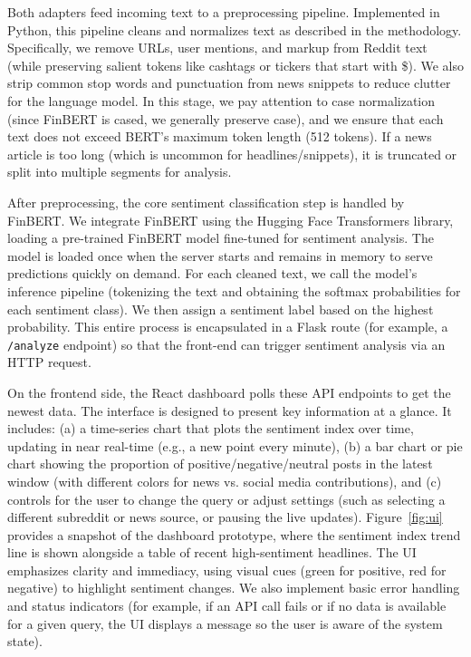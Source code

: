 \documentclass[12pt]{article}
\begin{document}
Both adapters feed incoming text to a preprocessing pipeline. Implemented in Python, this pipeline cleans and
normalizes text as described in the methodology. Specifically, we remove URLs, user mentions, and markup from
Reddit text (while preserving salient tokens like cashtags or tickers that start with \$). We also strip
common stop words and punctuation from news snippets to reduce clutter for the language model. In this stage,
we pay attention to case normalization (since FinBERT is cased, we generally preserve case), and we ensure
that each text does not exceed BERT's maximum token length (512 tokens). If a news article is too long (which
is uncommon for headlines/snippets), it is truncated or split into multiple segments for analysis.

After preprocessing, the core sentiment classification step is handled by FinBERT. We integrate FinBERT using
the Hugging Face Transformers library, loading a pre-trained FinBERT model fine-tuned for sentiment analysis.
The model is loaded once when the server starts and remains in memory to serve predictions quickly on demand.
For each cleaned text, we call the model's inference pipeline (tokenizing the text and obtaining the softmax
probabilities for each sentiment class). We then assign a sentiment label based on the highest probability.
This entire process is encapsulated in a Flask route (for example, a \texttt{/analyze} endpoint) so that the
front-end can trigger sentiment analysis via an HTTP request.

On the frontend side, the React dashboard polls these API endpoints to get the newest data. The interface is
designed to present key information at a glance. It includes: (a) a time-series chart that plots the
sentiment index over time, updating in near real-time (e.g., a new point every minute), (b) a bar chart or
pie chart showing the proportion of positive/negative/neutral posts in the latest window (with different
colors for news vs. social media contributions), and (c) controls for the user to change the query or adjust
settings (such as selecting a different subreddit or news source, or pausing the live updates).
Figure~\ref{fig:ui} provides a snapshot of the dashboard prototype, where the sentiment index trend line is
shown alongside a table of recent high-sentiment headlines. The UI emphasizes clarity and immediacy, using
visual cues (green for positive, red for negative) to highlight sentiment changes. We also implement basic
error handling and status indicators (for example, if an API call fails or if no data is available for a
given query, the UI displays a message so the user is aware of the system state).
\end{document}
